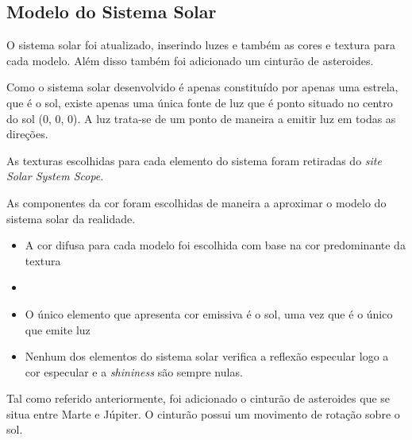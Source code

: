 \documentclass[relatorio.tex]{subfiles}
\begin{document}
    
\subsection{Modelo do Sistema Solar} \label{subsec:sistema_solar}

O sistema solar foi atualizado, inserindo luzes e também as cores
e textura para cada modelo. Além disso também foi adicionado um 
cinturão de asteroides.

Como o sistema solar desenvolvido é apenas constituído por apenas uma estrela, que é
o sol, existe apenas uma única fonte de luz que é ponto situado no centro do sol (0, 0, 0). A 
luz trata-se de um ponto de maneira a emitir luz em todas as direções.

As texturas escolhidas para cada elemento do sistema foram retiradas do \textit{site Solar System Scope}.

As componentes da cor foram escolhidas de maneira a aproximar o modelo do sistema solar da realidade. 
\begin{itemize}
    \item A cor difusa para cada modelo foi escolhida com base na cor predominante da textura
    \item 
    \item O único elemento que apresenta cor emissiva é o sol, uma vez que é o único que emite luz
    \item Nenhum dos elementos do sistema solar verifica a reflexão especular logo a cor especular 
    e a \textit{shininess} são sempre nulas.
\end{itemize}

Tal como referido anteriormente, foi adicionado o cinturão de asteroides que se situa entre Marte e 
Júpiter. O cinturão possui um movimento de rotação sobre o sol.
\end{document}
